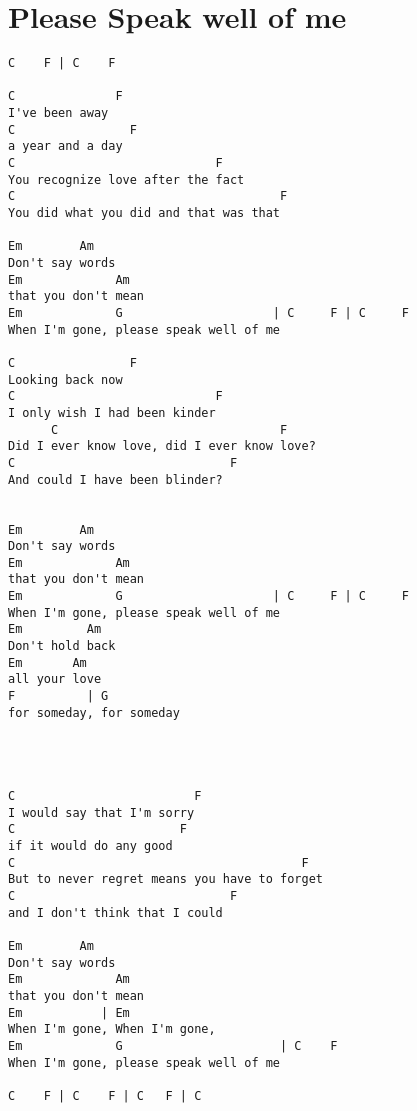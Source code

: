 \documentclass[leqno]{memoir}
\begin{document}
\newpage


\chapter{Please Speak well of me}
\begin{verbatim}
C    F | C    F 

C              F
I've been away 
C                F
a year and a day
C                            F
You recognize love after the fact
C                                     F
You did what you did and that was that

Em        Am
Don't say words 
Em             Am
that you don't mean
Em             G                     | C     F | C     F
When I'm gone, please speak well of me

C                F
Looking back now
C                            F
I only wish I had been kinder
      C                               F
Did I ever know love, did I ever know love?
C                              F
And could I have been blinder?


Em        Am
Don't say words 
Em             Am
that you don't mean
Em             G                     | C     F | C     F
When I'm gone, please speak well of me
Em         Am
Don't hold back 
Em       Am
all your love 
F          | G
for someday, for someday




C                         F
I would say that I'm sorry 
C                       F
if it would do any good
C                                        F
But to never regret means you have to forget
C                              F
and I don't think that I could 

Em        Am
Don't say words 
Em             Am
that you don't mean
Em           | Em
When I'm gone, When I'm gone, 
Em             G                      | C    F
When I'm gone, please speak well of me

C    F | C    F | C   F | C

\end{verbatim}
\newpage
\end{document}
